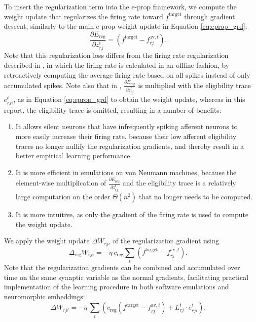 		To insert the regularization term into the e-prop framework, we compute the weight update that regularizes the firing rate toward $f^\text{target}$ through gradient descent, similarly to the main e-prop weight update in Equation \ref{eq:eprop_grd}:
		\begin{equation}
		\frac{\partial E_\text{reg}}{\partial z_{rj}^t} = \left(f^\text{target} - f^{\text{av}, t}_{rj}\right).
		\end{equation}
		Note that this regularization loss differs from the firing rate regularization described in \citet{bellec2020solution}, in which the firing rate is calculated in an offline fashion, by retroactively computing the average firing rate based on all spikes instead of only accumulated spikes.
		Note also that in \citet{bellec2020solution}, $\frac{\partial E_\text{reg}}{\partial z_{rj}^t}$ is multiplied with the eligibility trace $e^t_{rji}$, as in Equation \ref{eq:eprop_grd} to obtain the weight update, whereas in this report, the eligibility trace is omitted, resulting in a number of benefits:
		\begin{enumerate}
			\item It allows silent neurons that have infrequently spiking afferent neurons to more easily increase their firing rate, because their low afferent eligibility traces no longer nullify the regularization gradients, and thereby result in a better empirical learning performance.
			\item It is more efficient in emulations on von Neumann machines, because the element-wise multiplication of $\frac{\partial E_\text{reg}}{\partial z_{rj}^t}$ and the eligibility trace is a relatively large computation on the order $\Theta\!\left(n^2\right)$ that no longer needs to be computed.
			\item It is more intuitive, as only the gradient of the firing rate is used to compute the weight update.
		\end{enumerate}
		We apply the weight update $\Delta W_{rji}$ of the regularization gradient using
		\begin{equation}\label{eq:deltareg}
		\Delta_\text{reg} W_{rji} = -\eta\ c_\text{reg}\sum_t\left(f^\text{target} - f^{\text{av}, t}_{rj}\right).
		\end{equation}
		Note that the regularization gradients can be combined and accumulated over time on the same synaptic variable as the normal gradients, facilitating practical implementation of the learning procedure in both software emulations and neuromorphic embeddings:
		\begin{equation}
		\Delta W_{rji} = -\eta\ \sum_t\left(c_\text{reg}\left(f^\text{target} - f^{\text{av}, t}_{rj}\right) + L^t_{rj}\cdot\bar{e}^t_{rji}\right).
		\end{equation}

